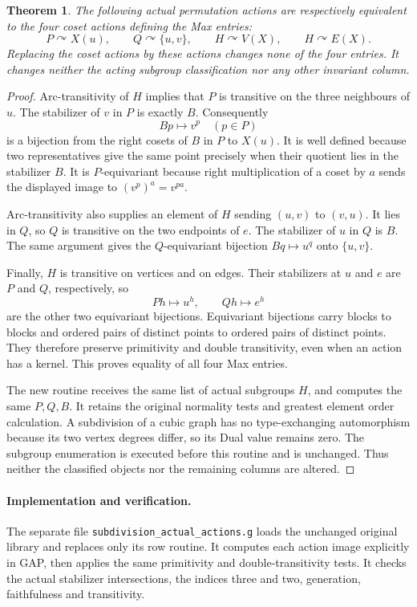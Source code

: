 \documentclass[11pt,a4paper]{article}
\newtheorem{theorem}{Theorem}
\begin{document}
\begin{theorem}
The following actual permutation actions are respectively
equivalent to the four coset actions defining the Max entries:
\[
 P\curvearrowright X(u),\qquad
 Q\curvearrowright\{u,v\},\qquad
 H\curvearrowright V(X),\qquad
 H\curvearrowright E(X).
\]
Replacing the coset actions by these actions changes none of the
four entries. It changes neither the acting subgroup classification
nor any other invariant column.
\end{theorem}
\begin{proof}
Arc-transitivity of $H$ implies that $P$ is transitive on the three
neighbours of $u$. The stabilizer of $v$ in $P$ is exactly $B$.
Consequently
\[
                   Bp\longmapsto v^p\quad(p\in P)
\]
is a bijection from the right cosets of $B$ in $P$ to $X(u)$.
It is well defined because two representatives give the same
point precisely when their quotient lies in the stabilizer $B$.
It is $P$-equivariant because right multiplication of a coset by
$a$ sends the displayed image to $(v^p)^a=v^{pa}$.

Arc-transitivity also supplies an element of $H$ sending $(u,v)$
to $(v,u)$. It lies in $Q$, so $Q$ is transitive on the two
endpoints of $e$. The stabilizer of $u$ in $Q$ is $B$. The same
argument gives the $Q$-equivariant bijection
$Bq\mapsto u^q$ onto $\{u,v\}$.

Finally, $H$ is transitive on vertices and on edges. Their
stabilizers at $u$ and $e$ are $P$ and $Q$, respectively, so
\[
                  Ph\longmapsto u^h,\qquad
                  Qh\longmapsto e^h
\]
are the other two equivariant bijections. Equivariant bijections
carry blocks to blocks and ordered pairs of distinct points to
ordered pairs of distinct points. They therefore preserve
primitivity and double transitivity, even when an action has a
kernel. This proves equality of all four Max entries.

The new routine receives the same list of actual subgroups $H$,
and computes the same $P,Q,B$. It retains the original normality
tests and greatest element order calculation. A subdivision of a
cubic graph has no type-exchanging automorphism because its two
vertex degrees differ, so its Dual value remains zero. The
subgroup enumeration is executed before this routine and is
unchanged. Thus neither the classified objects nor the remaining
columns are altered.
\end{proof}

\paragraph{Implementation and verification.}
The separate file \texttt{subdivision\_actual\_actions.g} loads the
unchanged original library and replaces only its row routine.
It computes each action image explicitly in GAP, then applies the
same primitivity and double-transitivity tests. It checks the
actual stabilizer intersections, the indices three and two,
generation, faithfulness and transitivity.
\end{document}

